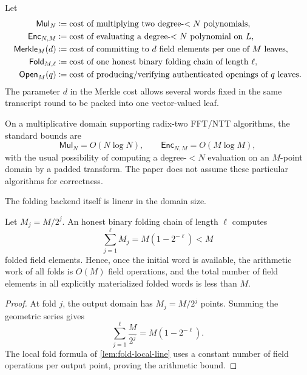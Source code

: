 \begin{definition}
\label{def:complexity-kernels}
Let
\begin{align}
  \mathsf{Mul}_N
  &\coloneqq \text{cost of multiplying two degree-$<N$ polynomials},\\
  \mathsf{Enc}_{N,M}
  &\coloneqq \text{cost of evaluating a degree-$<N$ polynomial on $L$},\\
  \mathsf{Merkle}_{M}(d)
  &\coloneqq \text{cost of committing to $d$ field elements per one of $M$ leaves},\\
  \mathsf{Fold}_{M,\ell}
  &\coloneqq \text{cost of one honest binary folding chain of length $\ell$},\\
  \mathsf{Open}_{M}(q)
  &\coloneqq \text{cost of producing/verifying authenticated openings of $q$ leaves}.
  \label{eq:complexity-kernel-costs}
\end{align}
The parameter $d$ in the Merkle cost allows several words fixed in the same transcript round to be packed into one vector-valued leaf.
\end{definition}

On a multiplicative domain supporting radix-two FFT/NTT algorithms, the standard bounds are
\begin{equation}
  \mathsf{Mul}_N=O(N\log N),
  \qquad
  \mathsf{Enc}_{N,M}=O(M\log M),
  \label{eq:standard-fft-bounds}
\end{equation}
with the usual possibility of computing a degree-$<N$ evaluation on an $M$-point domain by a padded transform.  The paper does not assume these particular algorithms for correctness.

The folding backend itself is linear in the domain size.

\begin{proposition}
\label{prop:folding-arithmetic-cost}
Let $M_j=M/2^j$.  An honest binary folding chain of length $\ell$ computes
\begin{equation}
  \sum_{j=1}^{\ell}M_j
  =M(1-2^{-\ell})
  <M
  \label{eq:fold-total-output-cells}
\end{equation}
folded field elements.  Hence, once the initial word is available, the arithmetic work of all folds is $O(M)$ field operations, and the total number of field elements in all explicitly materialized folded words is less than $M$.
\end{proposition}

\begin{proof}
At fold $j$, the output domain has $M_j=M/2^j$ points.  Summing the geometric series gives
\[
  \sum_{j=1}^{\ell}\frac{M}{2^j}
  =M\left(1-2^{-\ell}\right).
\]
The local fold formula of \cref{lem:fold-local-line} uses a constant number of field operations per output point, proving the arithmetic bound.
\end{proof}

